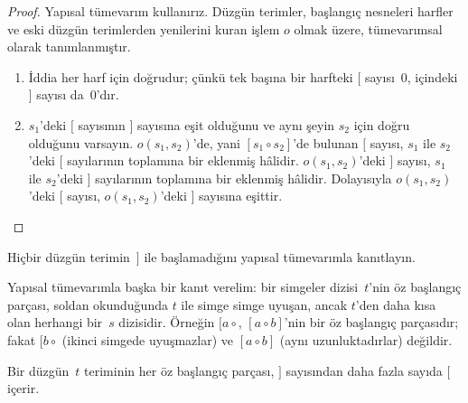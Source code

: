 \begin{proof}
Yapısal tümevarım kullanırız. Düzgün terimler, başlangıç nesneleri
harfler ve eski düzgün terimlerden yenilerini kuran işlem $o$ olmak
üzere, tümevarımsal olarak tanımlanmıştır.
\begin{enumerate}
\item İddia her harf için doğrudur; çünkü tek başına bir harfteki $[$
  sayısı~$0$, içindeki $]$ sayısı da~$0$'dır.
\item $s_1$'deki $[$ sayısının $]$ sayısına eşit olduğunu ve aynı şeyin
  $s_2$ için doğru olduğunu varsayın. $o(s_1, s_2)$'de, yani $[s_1
  \circ s_2]$'de bulunan $[$ sayısı, $s_1$ ile $s_2$'deki $[$
  sayılarının toplamına bir eklenmiş hâlidir. $o(s_1, s_2)$'deki $]$
  sayısı, $s_1$ ile $s_2$'deki $]$ sayılarının toplamına bir eklenmiş
  hâlidir. Dolayısıyla $o(s_1, s_2)$'deki $[$ sayısı, $o(s_1,s_2)$'deki
  $]$ sayısına eşittir.
\end{enumerate}
\end{proof}

\begin{prob}
  Hiçbir düzgün terimin~$]$ ile başlamadığını yapısal tümevarımla
  kanıtlayın.
\end{prob}

Yapısal tümevarımla başka bir kanıt verelim: bir simgeler dizisi~$t$'nin
öz başlangıç parçası, soldan okunduğunda $t$ ile simge simge uyuşan,
ancak $t$'den daha kısa olan herhangi bir~$s$ dizisidir. Örneğin $[a
\circ {}$, $[a \circ b]$'nin bir öz başlangıç parçasıdır; fakat $[b
\circ {}$ (ikinci simgede uyuşmazlar) ve $[a \circ b]$ (aynı
uzunluktadırlar) değildir.

\begin{prop}
  Bir düzgün~$t$ teriminin her öz başlangıç parçası, $]$ sayısından
  daha fazla sayıda $[$ içerir.
\end{prop}

